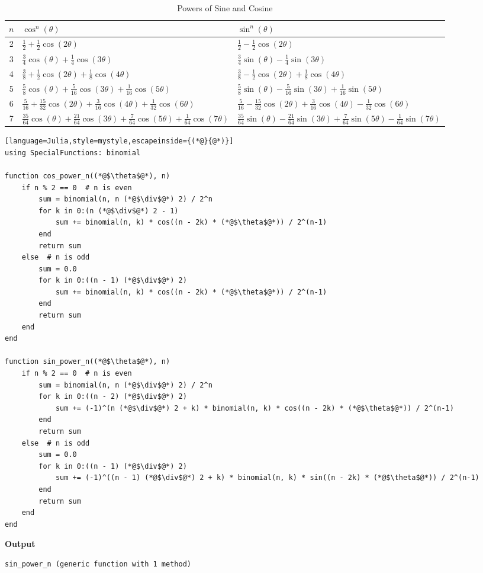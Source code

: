 \bigskip
\begin{table}[htb]
\centering
\renewcommand{\arraystretch}{1.8} %
\begin{tabular}{|c|m{8cm}|m{8cm}|}
\hline
\( n \) & \centering \( \cos^n(\theta) \) & \centering \( \sin^n(\theta) \) \tabularnewline
\hline
2 & \centering \( \frac{1}{2} + \frac{1}{2} \cos(2\theta) \) & \centering \( \frac{1}{2} - \frac{1}{2} \cos(2\theta) \) \tabularnewline
\hline
3 & \centering \( \frac{3}{4} \cos(\theta) + \frac{1}{4} \cos(3\theta) \) & \centering \( \frac{3}{4} \sin(\theta) - \frac{1}{4} \sin(3\theta) \) \tabularnewline
\hline
4 & \centering \( \frac{3}{8} + \frac{1}{2} \cos(2\theta) + \frac{1}{8} \cos(4\theta) \) & \centering \( \frac{3}{8} - \frac{1}{2} \cos(2\theta) + \frac{1}{8} \cos(4\theta) \) \tabularnewline
\hline
5 & \centering \( \frac{5}{8} \cos(\theta) + \frac{5}{16} \cos(3\theta) + \frac{1}{16} \cos(5\theta) \) & \centering \( \frac{5}{8} \sin(\theta) - \frac{5}{16} \sin(3\theta) + \frac{1}{16} \sin(5\theta) \) \tabularnewline
\hline
6 & \centering \( \frac{5}{16} + \frac{15}{32} \cos(2\theta) + \frac{3}{16} \cos(4\theta) + \frac{1}{32} \cos(6\theta) \) & \centering \( \frac{5}{16} - \frac{15}{32} \cos(2\theta) + \frac{3}{16} \cos(4\theta) - \frac{1}{32} \cos(6\theta) \) \tabularnewline
\hline
7 & \centering \( \frac{35}{64} \cos(\theta) + \frac{21}{64} \cos(3\theta) + \frac{7}{64} \cos(5\theta) + \frac{1}{64} \cos(7\theta) \) & \centering \( \frac{35}{64} \sin(\theta) - \frac{21}{64} \sin(3\theta) + \frac{7}{64} \sin(5\theta) - \frac{1}{64} \sin(7\theta) \) \tabularnewline
\hline
\end{tabular}
\caption{Powers of Sine and Cosine}
\label{table:sine-cosine-powers}
\end{table}

\bigskip

\begin{lstlisting}[language=Julia,style=mystyle,escapeinside={(*@}{@*)}]
using SpecialFunctions: binomial

function cos_power_n((*@$\theta$@*), n)
    if n % 2 == 0  # n is even
        sum = binomial(n, n (*@$\div$@*) 2) / 2^n
        for k in 0:(n (*@$\div$@*) 2 - 1)
            sum += binomial(n, k) * cos((n - 2k) * (*@$\theta$@*)) / 2^(n-1)
        end
        return sum
    else  # n is odd
        sum = 0.0
        for k in 0:((n - 1) (*@$\div$@*) 2)
            sum += binomial(n, k) * cos((n - 2k) * (*@$\theta$@*)) / 2^(n-1)
        end
        return sum
    end
end

function sin_power_n((*@$\theta$@*), n)
    if n % 2 == 0  # n is even
        sum = binomial(n, n (*@$\div$@*) 2) / 2^n
        for k in 0:((n - 2) (*@$\div$@*) 2)
            sum += (-1)^(n (*@$\div$@*) 2 + k) * binomial(n, k) * cos((n - 2k) * (*@$\theta$@*)) / 2^(n-1)
        end
        return sum
    else  # n is odd
        sum = 0.0
        for k in 0:((n - 1) (*@$\div$@*) 2)
            sum += (-1)^((n - 1) (*@$\div$@*) 2 + k) * binomial(n, k) * sin((n - 2k) * (*@$\theta$@*)) / 2^(n-1)
        end
        return sum
    end
end
\end{lstlisting}
\textbf{Output} 
\begin{verbatim}
sin_power_n (generic function with 1 method)
\end{verbatim}

